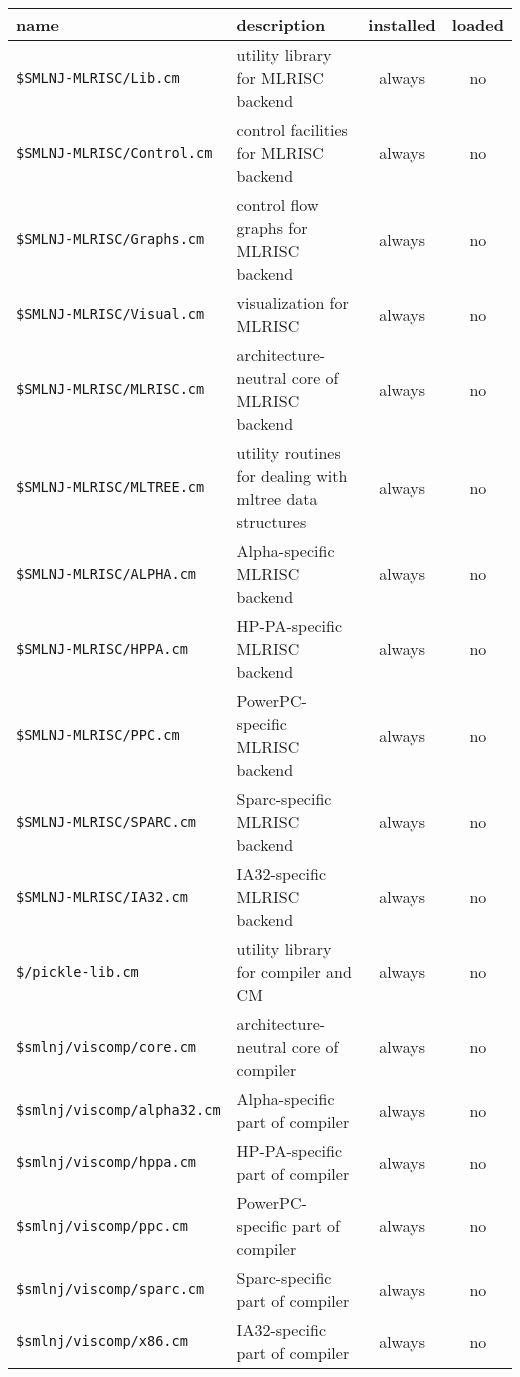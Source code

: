 \begin{small}
\begin{center}
\begin{tabular}{p{2.5in}||p{2.6in}|c|c}
name & description & installed & loaded \\
\hline\hline
{\tt \$SMLNJ-MLRISC/Lib.cm} & utility library for MLRISC backend & always &
no \\
\hline 
{\tt \$SMLNJ-MLRISC/Control.cm} & control facilities for MLRISC backend &
always & no \\
\hline
{\tt \$SMLNJ-MLRISC/Graphs.cm} & control flow graphs for MLRISC backend &
always & no \\
\hline
{\tt \$SMLNJ-MLRISC/Visual.cm} & visualization for MLRISC & always & no \\
\hline
{\tt \$SMLNJ-MLRISC/MLRISC.cm} & architecture-neutral core of MLRISC backend
& always & no \\
\hline
{\tt \$SMLNJ-MLRISC/MLTREE.cm} & utility routines for dealing with
mltree data structures & always & no \\
\hline
{\tt \$SMLNJ-MLRISC/ALPHA.cm} & Alpha-specific MLRISC backend & always & no \\
\hline
{\tt \$SMLNJ-MLRISC/HPPA.cm} & HP-PA-specific MLRISC backend & always & no \\
\hline
{\tt \$SMLNJ-MLRISC/PPC.cm} & PowerPC-specific MLRISC backend & always & no \\
\hline
{\tt \$SMLNJ-MLRISC/SPARC.cm} & Sparc-specific MLRISC backend & always & no \\
\hline 
{\tt \$SMLNJ-MLRISC/IA32.cm} & IA32-specific MLRISC backend & always & no \\
\hline\hline
{\tt \$/pickle-lib.cm} & utility library for compiler and CM & always & no \\
\hline
{\tt \$smlnj/viscomp/core.cm} & architecture-neutral core of compiler
& always & no \\
\hline
{\tt \$smlnj/viscomp/alpha32.cm} & Alpha-specific part of compiler &
always & no \\
\hline
{\tt \$smlnj/viscomp/hppa.cm} & HP-PA-specific part of compiler &
always & no \\
\hline
{\tt \$smlnj/viscomp/ppc.cm} & PowerPC-specific part of compiler &
always & no \\
\hline
{\tt \$smlnj/viscomp/sparc.cm} & Sparc-specific part of compiler &
always & no \\
\hline
{\tt \$smlnj/viscomp/x86.cm} & IA32-specific part of compiler & always
& no \\

\end{tabular}
\end{center}
\end{small}

